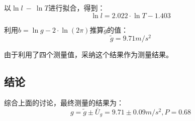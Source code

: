 \documentclass[a4paper]{ltxdoc}
\begin{document}
\begin{multicols}{2}
  以$\ln l\ -\ \ln T$进行拟合，得到：
  $$
    \ln l= 2.022\cdot \ln T -1.403
  $$

  利用$b=\ln g -2\cdot \ln(2\pi)$推算$\widetilde{g}$的值：
  $$
    \widetilde{g} = 9.71m/s^2
  $$

  由于利用了四个测量值，采纳这个结果作为测量结果。

  \subsection{结论}
  综合上面的讨论，最终测量的结果为：
  $$
    g=\widetilde{g} \pm \bar U_g =9.71 \pm 0.09 m/s^2, P=0.68
  $$
  \theendnotes



\end{multicols}
\end{document}

